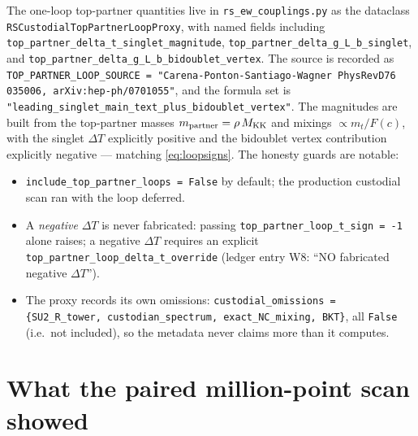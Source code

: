 \documentclass[11pt]{article}
\newcommand{\MKK}{M_{\mathrm{KK}}}
\newcommand{\code}[1]{\texttt{#1}}
\theoremstyle{definition}
\begin{document}
The one-loop top-partner quantities live in \code{rs\_ew\_couplings.py} as the
dataclass \code{RSCustodialTopPartnerLoopProxy}, with named fields including
\code{top\_partner\_delta\_t\_singlet\_magnitude},
\code{top\_partner\_delta\_g\_L\_b\_singlet}, and
\code{top\_partner\_delta\_g\_L\_b\_bidoublet\_vertex}. The source is recorded as
\code{TOP\_PARTNER\_LOOP\_SOURCE = "Carena-Ponton-Santiago-Wagner PhysRevD76
035006, arXiv:hep-ph/0701055"}, and the formula set is
\code{"leading\_singlet\_main\_text\_plus\_bidoublet\_vertex"}. The magnitudes are
built from the top-partner masses $m_{\rm partner}=\rho\,\MKK$ and mixings
$\propto m_t/F(c)$, with the singlet $\Delta T$ explicitly positive and the
bidoublet vertex contribution explicitly negative --- matching
\eqref{eq:loopsigns}. The honesty guards are notable:
\begin{itemize}[leftmargin=1.4em]
\item \code{include\_top\_partner\_loops = False} by default; the production
custodial scan ran with the loop deferred.
\item A \emph{negative} $\Delta T$ is never fabricated: passing
\code{top\_partner\_loop\_t\_sign = -1} alone raises; a negative $\Delta T$
requires an explicit \code{top\_partner\_loop\_delta\_t\_override} (ledger entry
W8: ``NO fabricated negative $\Delta T$'').
\item The proxy records its own omissions:
\code{custodial\_omissions = \{SU2\_R\_tower, custodian\_spectrum,
exact\_NC\_mixing, BKT\}}, all \code{False} (i.e.\ not included), so the
metadata never claims more than it computes.
\end{itemize}

\section{What the paired million-point scan showed}
\label{sec:scans}
\end{document}
